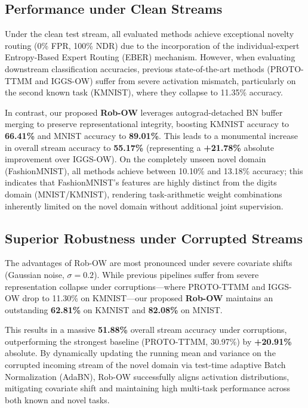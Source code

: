 \documentclass{article}
\begin{document}
\subsection{Performance under Clean Streams}
Under the clean test stream, all evaluated methods achieve exceptional novelty routing (0\% FPR, 100\% NDR) due to the incorporation of the individual-expert Entropy-Based Expert Routing (EBER) mechanism. However, when evaluating downstream classification accuracies, previous state-of-the-art methods (PROTO-TTMM and IGGS-OW) suffer from severe activation mismatch, particularly on the second known task (KMNIST), where they collapse to 11.35\% accuracy.

In contrast, our proposed \textbf{Rob-OW} leverages autograd-detached BN buffer merging to preserve representational integrity, boosting KMNIST accuracy to \textbf{66.41\%} and MNIST accuracy to \textbf{89.01\%}. This leads to a monumental increase in overall stream accuracy to \textbf{55.17\%} (representing a \textbf{+21.78\%} absolute improvement over IGGS-OW). On the completely unseen novel domain (FashionMNIST), all methods achieve between 10.10\% and 13.18\% accuracy; this indicates that FashionMNIST's features are highly distinct from the digits domain (MNIST/KMNIST), rendering task-arithmetic weight combinations inherently limited on the novel domain without additional joint supervision.

\subsection{Superior Robustness under Corrupted Streams}
The advantages of Rob-OW are most pronounced under severe covariate shifts (Gaussian noise, $\sigma = 0.2$). While previous pipelines suffer from severe representation collapse under corruptions---where PROTO-TTMM and IGGS-OW drop to 11.30\% on KMNIST---our proposed \textbf{Rob-OW} maintains an outstanding \textbf{62.81\%} on KMNIST and \textbf{82.08\%} on MNIST. 

This results in a massive \textbf{51.88\%} overall stream accuracy under corruptions, outperforming the strongest baseline (PROTO-TTMM, 30.97\%) by \textbf{+20.91\%} absolute. By dynamically updating the running mean and variance on the corrupted incoming stream of the novel domain via test-time adaptive Batch Normalization (AdaBN), Rob-OW successfully aligns activation distributions, mitigating covariate shift and maintaining high multi-task performance across both known and novel tasks.
\end{document}
